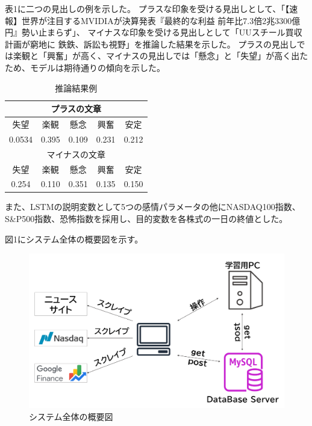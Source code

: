 \documentclass[a4paper, 10pt]{article}
\begin{document}
表1に二つの見出しの例を示した。
プラスな印象を受ける見出しとして、「【速報】世界が注目するMVIDIAが決算発表『最終的な利益 前年比7.3倍2兆3300億円』勢い止まらず」、
マイナスな印象を受ける見出しとして「UUスチール買収計画が窮地に 鉄鉄、訴訟も視野」を推論した結果を示した。
プラスの見出しでは楽観と「興奮」が高く、マイナスの見出しでは「懸念」と「失望」が高く出たため、モデルは期待通りの傾向を示した。




\begin{table}[t]
    \centering
    \caption{推論結果例}

    \begin{tabular}{|c|c|c|c|c|}\hline
        \multicolumn{5}{|c|}{プラスの文章} \\ \hline
        失望 & 楽観 & 懸念 & 興奮 & 安定 \\ \hline
        0.0534 & 0.395 & 0.109 & 0.231 & 0.212 \\ \hline
        \multicolumn{5}{|c|}{マイナスの文章} \\ \hline
        失望 & 楽観 & 懸念 & 興奮 & 安定 \\ \hline
        0.254 & 0.110 & 0.351 & 0.135 & 0.150 \\ \hline
    \end{tabular}

\end{table}

また、LSTMの説明変数として5つの感情パラメータの他にNASDAQ100指数、S\&P500指数、恐怖指数を採用し、目的変数を各株式の一日の終値とした。

図1にシステム全体の概要図を示す。

\begin{figure}[H]
    \centering
    \includegraphics[width=0.65\columnwidth]{./assets/system.png}
    \caption{システム全体の概要図}
\end{figure}
\end{document}
